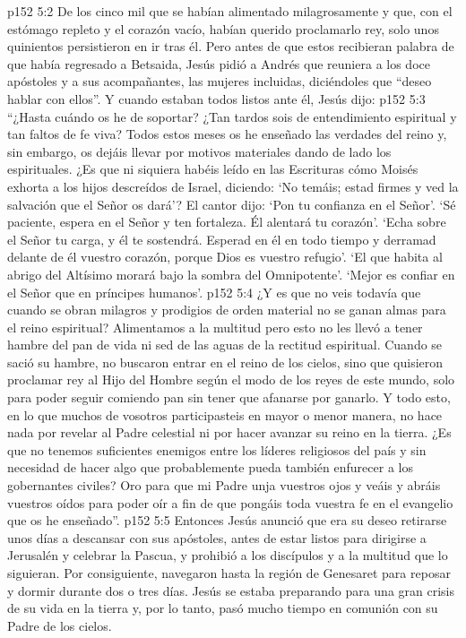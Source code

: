 \vs p152 5:2 \pc De los cinco mil que se habían alimentado milagrosamente y que, con el estómago repleto y el corazón vacío, habían querido proclamarlo rey, solo unos quinientos persistieron en ir tras él. Pero antes de que estos recibieran palabra de que había regresado a Betsaida, Jesús pidió a Andrés que reuniera a los doce apóstoles y a sus acompañantes, las mujeres incluidas, diciéndoles que “deseo hablar con ellos”. Y cuando estaban todos listos ante él, Jesús dijo:
\vs p152 5:3 \pc “¿Hasta cuándo os he de soportar? ¿Tan tardos sois de entendimiento espiritual y tan faltos de fe viva? Todos estos meses os he enseñado las verdades del reino y, sin embargo, os dejáis llevar por motivos materiales dando de lado los espirituales. ¿Es que ni siquiera habéis leído en las Escrituras cómo Moisés exhorta a los hijos descreídos de Israel, diciendo: ‘No temáis; estad firmes y ved la salvación que el Señor os dará’? El cantor dijo: ‘Pon tu confianza en el Señor’. ‘Sé paciente, espera en el Señor y ten fortaleza. Él alentará tu corazón’. ‘Echa sobre el Señor tu carga, y él te sostendrá. Esperad en él en todo tiempo y derramad delante de él vuestro corazón, porque Dios es vuestro refugio’. ‘El que habita al abrigo del Altísimo morará bajo la sombra del Omnipotente’. ‘Mejor es confiar en el Señor que en príncipes humanos’.
\vs p152 5:4 ¿Y es que no veis todavía que cuando se obran milagros y prodigios de orden material no se ganan almas para el reino espiritual? Alimentamos a la multitud pero esto no les llevó a tener hambre del pan de vida ni sed de las aguas de la rectitud espiritual. Cuando se sació su hambre, no buscaron entrar en el reino de los cielos, sino que quisieron proclamar rey al Hijo del Hombre según el modo de los reyes de este mundo, solo para poder seguir comiendo pan sin tener que afanarse por ganarlo. Y todo esto, en lo que muchos de vosotros participasteis en mayor o menor manera, no hace nada por revelar al Padre celestial ni por hacer avanzar su reino en la tierra. ¿Es que no tenemos suficientes enemigos entre los líderes religiosos del país y sin necesidad de hacer algo que probablemente pueda también enfurecer a los gobernantes civiles? Oro para que mi Padre unja vuestros ojos y veáis y abráis vuestros oídos para poder oír a fin de que pongáis toda vuestra fe en el evangelio que os he enseñado”.
\vs p152 5:5 \pc Entonces Jesús anunció que era su deseo retirarse unos días a descansar con sus apóstoles, antes de estar listos para dirigirse a Jerusalén y celebrar la Pascua, y prohibió a los discípulos y a la multitud que lo siguieran. Por consiguiente, navegaron hasta la región de Genesaret para reposar y dormir durante dos o tres días. Jesús se estaba preparando para una gran crisis de su vida en la tierra y, por lo tanto, pasó mucho tiempo en comunión con su Padre de los cielos.
